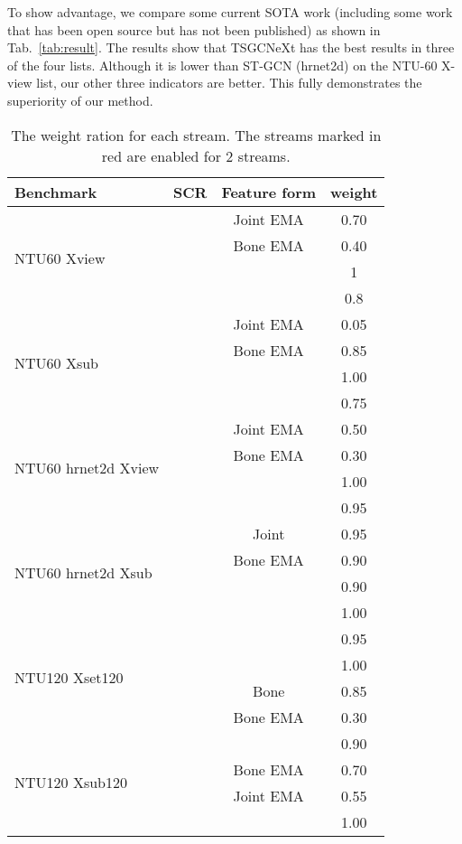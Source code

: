 \documentclass[10pt,twocolumn,letterpaper]{article}
\begin{document}
To show advantage, we compare some current SOTA work (including some work that has been open source but has not been published) as shown in Tab.~\ref{tab:result}. The results show that TSGCNeXt has the best results in three of the four lists. Although it is lower than ST-GCN (hrnet2d) on the NTU-60 X-view list, our other three indicators are better. This fully demonstrates the superiority of our method.

\begin{table}[htbp]
  \centering
  \caption{The weight ration for each stream. The streams marked in red are enabled for 2 streams.}
    \begin{tabular}{l|cc|c}
    \toprule
    Benchmark & SCR &Feature form & weight \\
    \midrule
    \multirow{4}[2]{*}{NTU60 Xview}& & Joint EMA & 0.70  \\
          & & Bone EMA & 0.40  \\
          &\color{red}{}  &\color{red}{ Joint EMA}& 1  \\
          &\color{red}{}  & \color{red}{Bone EMA}& 0.8  \\
    \midrule
    \multirow{4}[2]{*}{NTU60 Xsub}& & Joint EMA & 0.05  \\
         & & Bone EMA  & 0.85  \\
         &\color{red}{ } & \color{red}{Joint EMA} & 1.00  \\
         &\color{red}{}  &\color{red}{ Bone EMA }& 0.75  \\
    \midrule
    \multirow{4}[2]{*}{NTU60 hrnet2d Xview }& & Joint EMA & 0.50  \\
         & &Bone EMA& 0.30  \\
         &\color{red}{  }& \color{red}{Joint EMA} & 1.00  \\
         &\color{red}{}  & \color{red}{Bone EMA} & 0.95  \\
    \midrule
    \multirow{4}[2]{*}{NTU60 hrnet2d Xsub}& {}& Joint & 0.95  \\
         & & Bone EMA  & 0.90  \\
         &\color{red}{}  & \color{red}{Joint EMA}& 0.90  \\
         &\color{red}{}  & \color{red}{Bone EMA} & 1.00  \\
    \midrule
    \multirow{4}[2]{*}{NTU120 Xset120}&\color{red}{} & \color{red}{Joint EMA} & 0.95  \\
        & \color{red}{ } & \color{red}{Bone EMA}  & 1.00  \\
        &   & Bone & 0.85  \\
        &   & Bone EMA & 0.30  \\
    \midrule
    \multirow{4}[2]{*}{NTU120 Xsub120}&\color{red}{} & \color{red}{Joint EMA} & 0.90  \\
        &  & Bone EMA  & 0.70  \\
        &   & Joint EMA & 0.55  \\
        &\color{red}{   }& \color{red}{Bone EMA} & 1.00  \\
    \bottomrule
    \end{tabular}\label{tab:ws}\end{table}
\end{document}
